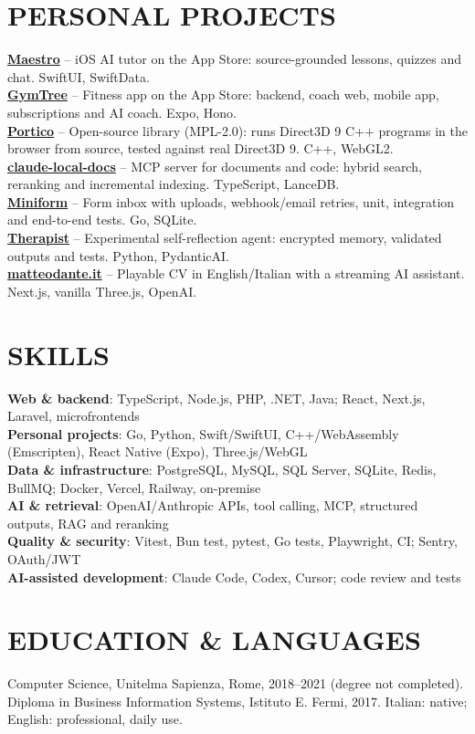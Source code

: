 \documentclass[a4paper,10pt]{article}
\renewcommand{\small}{\fontsize{10}{12}\selectfont}
\begin{document}
\section{PERSONAL PROJECTS}
\small
\textbf{\href{https://apps.apple.com/us/app/maestro-learn-anything/id6780267046?uo=4}{Maestro}} -- iOS AI tutor on the App Store: source-grounded lessons, quizzes and chat. SwiftUI, SwiftData.\\[3pt]
\textbf{\href{https://apps.apple.com/us/app/gymtree-workout-ai-coach/id6761392403?uo=4}{GymTree}} -- Fitness app on the App Store: backend, coach web, mobile app, subscriptions and AI coach. Expo, Hono.\\[3pt]
\textbf{\href{https://github.com/matteodante/portico}{Portico}} -- Open-source library (MPL-2.0): runs Direct3D 9 C++ programs in the browser from source, tested against real Direct3D 9. C++, WebGL2.\\[3pt]
\textbf{\href{https://github.com/matteodante/claude-local-docs}{claude-local-docs}} -- MCP server for documents and code: hybrid search, reranking and incremental indexing. TypeScript, LanceDB.\\[3pt]
\textbf{\href{https://github.com/matteodante/miniform}{Miniform}} -- Form inbox with uploads, webhook/email retries, unit, integration and end-to-end tests. Go, SQLite.\\[3pt]
\textbf{\href{https://github.com/matteodante/therapist}{Therapist}} -- Experimental self-reflection agent: encrypted memory, validated outputs and tests. Python, PydanticAI.\\[3pt]
\textbf{\href{https://matteodante.it}{matteodante.it}} -- Playable CV in English/Italian with a streaming AI assistant. Next.js, vanilla Three.js, OpenAI.
\section{SKILLS}
\small
\textbf{Web \& backend}: TypeScript, Node.js, PHP, .NET, Java; React, Next.js, Laravel, microfrontends\\[2pt]
\textbf{Personal projects}: Go, Python, Swift/SwiftUI, C++/WebAssembly (Emscripten), React Native (Expo), Three.js/WebGL\\[2pt]
\textbf{Data \& infrastructure}: PostgreSQL, MySQL, SQL Server, SQLite, Redis, BullMQ; Docker, Vercel, Railway, on-premise\\[2pt]
\textbf{AI \& retrieval}: OpenAI/Anthropic APIs, tool calling, MCP, structured outputs, RAG and reranking\\[2pt]
\textbf{Quality \& security}: Vitest, Bun test, pytest, Go tests, Playwright, CI; Sentry, OAuth/JWT\\[2pt]
\textbf{AI-assisted development}: Claude Code, Codex, Cursor; code review and tests
\section{EDUCATION \& LANGUAGES}
\small
Computer Science, Unitelma Sapienza, Rome, 2018--2021 (degree not completed).\\[2pt]
Diploma in Business Information Systems, Istituto E. Fermi, 2017. Italian: native; English: professional, daily use.
\end{document}
